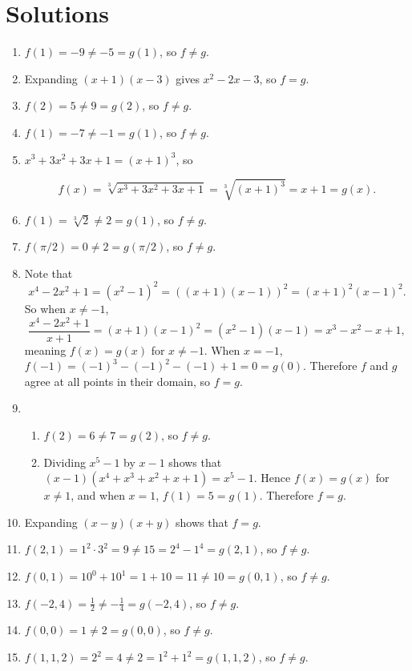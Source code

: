 \documentclass[12pt,a4paper]{article}
\begin{document}
\newpage

\section*{Solutions}

\begin{enumerate}
	\item $f(1) = -9 \ne -5 = g(1)$, so $f \ne g$.
	\item Expanding $(x+1)(x-3)$ gives $x^2 - 2x - 3$, so $f = g$.
	\item $f(2) = 5 \ne 9 = g(2)$, so $f \ne g$.
	\item $f(1) = -7 \ne -1 = g(1)$, so $f \ne g$.
	\item $x^3 + 3x^2 + 3x + 1 = (x+1)^3$, so

\[
	f(x) = \sqrt[3]{x^3 + 3x^2 + 3x + 1} = \sqrt[3]{(x+1)^3} = x + 1 = g(x).
\]
	\item $f(1) = \sqrt[3]{2} \ne 2 = g(1)$, so $f \ne g$.
	\item $f(\pi/2) = 0 \ne 2 = g(\pi/2)$, so $f \ne g$.
	\item Note that
\[
 x^4 - 2x^2 + 1 = (x^2 - 1)^2 = \left( (x+1)(x-1) \right)^2 = (x+1)^2(x-1)^2.
\]
So when $x \ne -1$,
\[
\frac{x^4 - 2x^2 + 1}{x + 1} = (x+1)(x-1)^2 = (x^2 - 1)(x-1) = x^3 - x^2 - x + 1,
\]
meaning $f(x) = g(x)$ for $x \ne -1$. When $x = -1$, $f(-1) = (-1)^3 - (-1)^2 - (-1) + 1 = 0 = g(0)$. Therefore $f$ and $g$ agree at all points in their domain, so $f = g$.
	\item \begin{enumerate}
			\item $f(2) = 6 \ne 7 = g(2)$, so $f \ne g$.
			\item Dividing $x^5 - 1$ by $x -1$ shows that $(x-1)(x^4 + x^3 + x^2 + x + 1) = x^5 - 1$. Hence $f(x) = g(x)$ for $x \ne 1$, and when $x = 1$, $f(1) = 5 = g(1)$. Therefore $f =g$.
			\end{enumerate}
	\item Expanding $(x-y)(x+y)$ shows that $f = g$.
	\item $f(2,1) = 1^2 \cdot 3^2 = 9 \ne 15 = 2^4 - 1^4 = g(2,1)$, so $f \ne g$.
	\item $f(0,1) = 10^0 + 10^1 = 1 + 10 = 11 \ne 10 = g(0,1)$, so $f \ne g$.
	\item $f(-2,4) = \frac{1}{2} \ne -\frac{1}{4} = g(-2,4)$, so $f \ne g$.
	\item $f(0,0) = 1 \ne 2 = g(0,0)$, so $f \ne g$.
	\item $f(1,1,2) = 2^2 = 4 \ne 2 = 1^2 + 1^2 = g(1,1,2)$, so $f \ne g$.
\end{enumerate}
\end{document}
